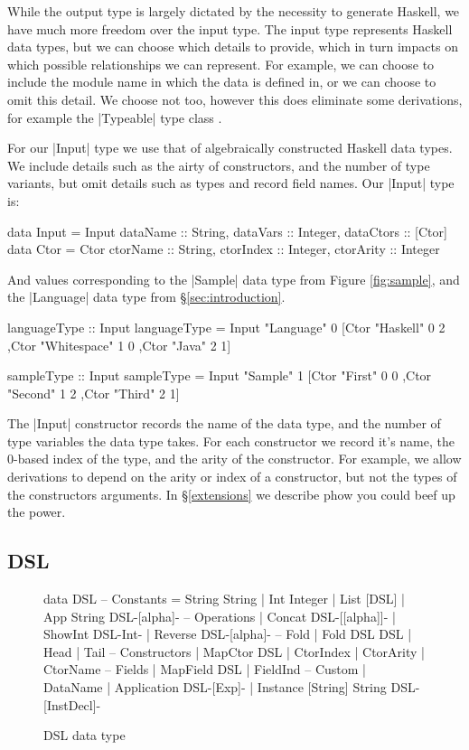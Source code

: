 \documentclass[preprint]{sigplanconf}
\begin{document}
While the output type is largely dictated by the necessity to generate Haskell, we have much more freedom over the input type. The input type represents Haskell data types, but we can choose which details to provide, which in turn impacts on which possible relationships we can represent. For example, we can choose to include the module name in which the data is defined in, or we can choose to omit this detail. We choose not too, however this does eliminate some derivations, for example the |Typeable| type class \cite{syb1}.

For our |Input| type we use that of algebraically constructed Haskell data types. We include details such as the airty of constructors, and the number of type variants, but omit details such as types and record field names. Our |Input| type is:

\begin{code}
data Input = Input {dataName :: String, dataVars :: Integer, dataCtors :: [Ctor]}
data Ctor = Ctor {ctorName :: String, ctorIndex :: Integer, ctorArity :: Integer}
\end{code}

And values corresponding to the |Sample| data type from Figure \ref{fig:sample}, and the |Language| data type from \S\ref{sec:introduction}.

\begin{code}
languageType :: Input
languageType = Input "Language" 0
    [Ctor "Haskell" 0 2
    ,Ctor "Whitespace" 1 0
    ,Ctor "Java" 2 1]

sampleType :: Input
sampleType = Input "Sample" 1
    [Ctor "First" 0 0
    ,Ctor "Second" 1 2
    ,Ctor "Third" 2 1]
\end{code}

The |Input| constructor records the name of the data type, and the number of type variables the data type takes. For each constructor we record it's name, the 0-based index of the type, and the arity of the constructor. For example, we allow derivations to depend on the arity or index of a constructor, but not the types of the constructors arguments. In \S\ref{extensions} we describe phow you could beef up the power.

\subsection{DSL}

\begin{figure}
\begin{code}
data DSL
    -- Constants
    = String String
    | Int Integer
    | List [DSL]
    | App String DSL{-[alpha]-}
    -- Operations
    | Concat DSL{-[[alpha]]-}
    | ShowInt DSL{-Int-}
    | Reverse DSL{-[alpha]-}
    -- Fold
    | Fold DSL DSL
    | Head
    | Tail
    -- Constructors
    | MapCtor DSL
    | CtorIndex
    | CtorArity
    | CtorName
    -- Fields
    | MapField DSL
    | FieldInd
    -- Custom
    | DataName
    | Application DSL{-[Exp]-}
    | Instance [String] String DSL{-[InstDecl]-}
\end{code}
\caption{DSL data type}
\label{fig:dsl}
\end{figure}
\end{document}

